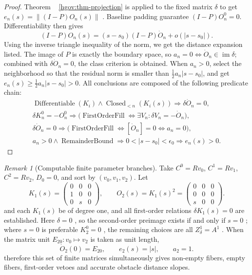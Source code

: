 \documentclass[12pt,a4paper,openany,notitlepage]{report}
\theoremstyle{plain}
\theoremstyle{definition}
\theoremstyle{remark}
\newtheorem{remark}[theorem]{Remark}
\def\mathcal#1{#1}\def\mathsf#1{#1}\def\mathbb#1{#1}%
\begin{document}
\begin{CJK*}
\begin{proof}
Theorem ~ \ref{hgov:thm-projection} is applied to the fixed matrix $\delta$ to get $e_n(s)=\|(I-P)O_n(s)\|$ . Baseline padding guarantee $(I-P)O_n^0=0$. Differentiability then gives \[
 (I-P)O_n(s)
 =(s-s_0)(I-P)\dot O_n+o(|s-s_0|).
\] Using the inverse triangle inequality of the norm, we get the distance expansion listed. The image of $P$ is exactly the boundary space, so $a_n=0\Longleftrightarrow\dot O_n\in\operatorname{im}\delta$; combined with $\delta\dot O_n=0$, the class criterion is obtained. When $a_n>0$, select the neighborhood so that the residual norm is smaller than $\frac12 a_n|s-s_0|$, and get $e_n(s)\ge\frac12a_n|s-s_0|>0$. All conclusions are composed of the following predicate chain: \[
 \begin{gathered}
 \operatorname{Differentiable}(K_i)\land
 \operatorname{Closed}_{<n}(K_i(s))
 \Rightarrow\delta\dot O_n=0,\\
 \delta K_n^0=-O_n^0
 \Rightarrow
 \bigl(\operatorname{FirstOrderFill}
       \Longleftrightarrow\exists V_n:\delta V_n=-\dot O_n\bigr),\\
 \delta\dot O_n=0
 \Rightarrow
 \bigl(\operatorname{FirstOrderFill}
       \Longleftrightarrow[\dot O_n]=0
       \Longleftrightarrow a_n=0\bigr),\\
 a_n>0\land\operatorname{RemainderBound}
 \Rightarrow
 0<|s-s_0|<\epsilon_0\Rightarrow e_n(s)>0.
 \end{gathered}
\]\end{proof}


\begin{remark}
[Computable finite parameter branches]\label{exp:hom:parameter-matrix}
Take $C^0=\mathbb R v_0$, $C^1=\mathbb R v_1$, $C^2=\mathbb R v_2$, $D_0=0$, and sort by $(v_0,v_1,v_2)$. Let \[
 K_1(s)=
 \begin{pmatrix}0&0&0\\1&0&0\\0&s&0\end{pmatrix},
 \qquad
 O_2(s)=K_1(s)^2=
 \begin{pmatrix}0&0&0\\0&0&0\\s&0&0\end{pmatrix}.
\] and each $K_1(s)$ be of degree one, and all first-order relations $\delta K_1(s)=0$ are established. Here $\delta=0$ , so the second-order preimage exists if and only if $s=0$ ; where $s=0$ is preferable $K_2^0=0$ , the remaining choices are all $Z^1_\delta=\mathcal A^1$ . When the matrix unit $E_{20}:v_0\mapsto v_2$ is taken as unit length, \[
 \dot O_2(0)=E_{20},\qquad
 e_2(s)=|s|,\qquad a_2=1.
\] therefore this set of finite matrices simultaneously gives non-empty fibers, empty fibers, first-order vetoes and accurate obstacle distance slopes.\end{remark}



\end{CJK*}
\end{document}
